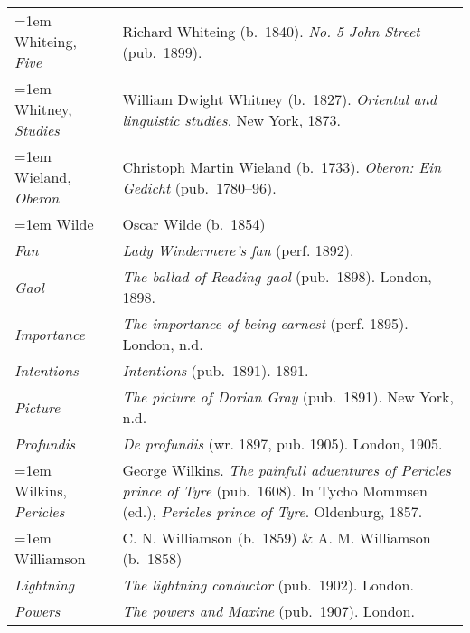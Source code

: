 \begin{xltabular}{\textwidth}{ lQ }
\hangindent=1em  Whiteing, \textit{Five} & Richard Whiteing (b.~1840). \textit{No. 5 John Street} (pub.~1899). \\

\hangindent=1em  Whitney, \textit{Studies} & William Dwight Whitney (b.~1827). \textit{Oriental and linguistic studies}. New York, 1873. \\ %

\hangindent=1em  Wieland, \textit{Oberon} & Christoph Martin Wieland (b.~1733). \textit{Oberon: Ein Gedicht} (pub.~1780--96). \\

\hangindent=1em  Wilde & Oscar Wilde (b.~1854) \\
\hspace{1em}\textit{Fan} & \textit{Lady Windermere’s fan} (perf. 1892). \\
\hspace{1em}\textit{Gaol} & \textit{The ballad of Reading gaol} (pub.~1898). London, 1898. \\
\hspace{1em}\textit{Importance} & \textit{The importance of being earnest} (perf. 1895). London, n.d. \\
\hspace{1em}\textit{Intentions} & \textit{Intentions} (pub.~1891). 1891. \\
\hspace{1em}\textit{Picture} & \textit{The picture of Dorian Gray} (pub.~1891). New York, n.d. \\
\hspace{1em}\textit{Profundis} & \textit{De profundis} (wr. 1897, pub. 1905). London, 1905. \\

\hangindent=1em  Wilkins, \textit{Pericles} & George Wilkins. \textit{The painfull aduentures of Pericles prince of Tyre} (pub.~1608). In Tycho Mommsen (ed.), \textit{Pericles prince of Tyre}. Oldenburg, 1857. \\

\hangindent=1em  Williamson & C. N. Williamson (b.~1859) \& A. M. Williamson (b.~1858) \\
\hspace{1em}\textit{Lightning} & \textit{The lightning conductor} (pub.~1902). London. \\ 
\hspace{1em}\textit{Powers} & \textit{The powers and Maxine} (pub.~1907). London. \\ 


\end{xltabular}
